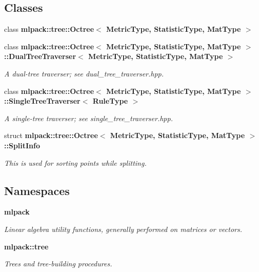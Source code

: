 \subsection*{Classes}
\begin{DoxyCompactItemize}
\item 
class {\bf mlpack\+::tree\+::\+Octree$<$ Metric\+Type, Statistic\+Type, Mat\+Type $>$}
\item 
class {\bf mlpack\+::tree\+::\+Octree$<$ Metric\+Type, Statistic\+Type, Mat\+Type $>$\+::\+Dual\+Tree\+Traverser$<$ Metric\+Type, Statistic\+Type, Mat\+Type $>$}
\begin{DoxyCompactList}\small\item\em A dual-\/tree traverser; see dual\+\_\+tree\+\_\+traverser.\+hpp. \end{DoxyCompactList}\item 
class {\bf mlpack\+::tree\+::\+Octree$<$ Metric\+Type, Statistic\+Type, Mat\+Type $>$\+::\+Single\+Tree\+Traverser$<$ Rule\+Type $>$}
\begin{DoxyCompactList}\small\item\em A single-\/tree traverser; see single\+\_\+tree\+\_\+traverser.\+hpp. \end{DoxyCompactList}\item 
struct {\bf mlpack\+::tree\+::\+Octree$<$ Metric\+Type, Statistic\+Type, Mat\+Type $>$\+::\+Split\+Info}
\begin{DoxyCompactList}\small\item\em This is used for sorting points while splitting. \end{DoxyCompactList}\end{DoxyCompactItemize}
\subsection*{Namespaces}
\begin{DoxyCompactItemize}
\item 
 {\bf mlpack}
\begin{DoxyCompactList}\small\item\em Linear algebra utility functions, generally performed on matrices or vectors. \end{DoxyCompactList}\item 
 {\bf mlpack\+::tree}
\begin{DoxyCompactList}\small\item\em Trees and tree-\/building procedures. \end{DoxyCompactList}\end{DoxyCompactItemize}
